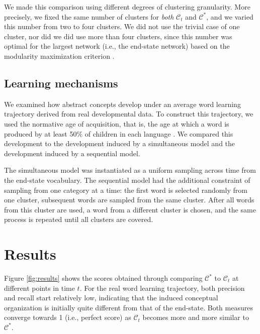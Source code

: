 \documentclass[11pt]{article}
\begin{document}
We made this comparison using different degrees of clustering
granularity. More precisely, we fixed the same number of clusters for
\emph{both} \(\mathcal{C}_t\) and \(\mathcal{C}^*\), and we varied this
number from two to four clusters. We did not use the trivial case of one
cluster, nor did we did use more than four clusters, since this number
was optimal for the largest network (i.e., the end-state network) based
on the modularity maximization criterion \cite{newman2006}.

\subsection{Learning mechanisms}\label{learning-mechanisms}

We examined how abstract concepts develop under an average word learning
trajectory derived from real developmental data. To construct this
trajectory, we used the normative age of acquisition, that is, the age
at which a word is produced by at least 50\% of children in each
language \cite{goodman2008}. We compared this development to the
development induced by a simultaneous model and the development induced
by a sequential model.

The simultaneous model was instantiated as a uniform sampling across
time from the end-state vocabulary. The sequential model had the
additional constraint of sampling from one category at a time: the first
word is selected randomly from one cluster, subsequent words are sampled
from the same cluster. After all words from this cluster are used, a
word from a different cluster is chosen, and the same process is
repeated until all clusters are covered.

\section{Results}\label{results}

Figure \ref{fig:results} shows the scores obtained through comparing
\(\mathcal{C}^*\) to \(\mathcal{C}_t\) at different points in time
\(t\). For the real word learning trajectory, both precision and recall
start relatively low, indicating that the induced conceptual
organization is initially quite different from that of the end-state.
Both measures converge towards 1 (i.e., perfect score) as
\(\mathcal{C}_t\) becomes more and more similar to \(\mathcal{C}^*\).
\end{document}
